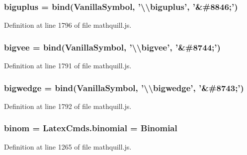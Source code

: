 \subsubsection[{biguplus}]{ biguplus = {\bf bind}({\bf Vanilla\-Symbol}, '\textbackslash{}\textbackslash{}biguplus', '\&\#8846;')}\label{mathquill_8js_ae82682d8f545e19dab117bb593385741}


Definition at line 1796 of file mathquill.\-js.

\subsubsection[{bigvee}]{ bigvee = {\bf bind}({\bf Vanilla\-Symbol}, '\textbackslash{}\textbackslash{}bigvee', '\&\#8744;')}\label{mathquill_8js_ae1f5d3ecebad2ed0df316d870271d532}


Definition at line 1791 of file mathquill.\-js.

\subsubsection[{bigwedge}]{ bigwedge = {\bf bind}({\bf Vanilla\-Symbol}, '\textbackslash{}\textbackslash{}bigwedge', '\&\#8743;')}\label{mathquill_8js_a39030b4ed66a09fccca97d84e1d67817}


Definition at line 1792 of file mathquill.\-js.

\subsubsection[{binom}]{ binom = Latex\-Cmds.\-binomial = {\bf Binomial}}\label{mathquill_8js_a9f745868a9d030c398e84cb0acaae008}


Definition at line 1265 of file mathquill.\-js.

